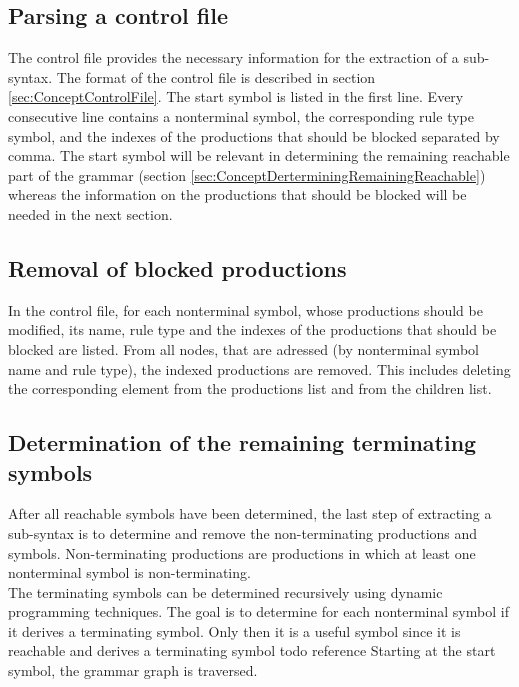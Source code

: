 \subsection{Parsing a control file}\label{sec:ConceptParsingControlFile}
The control file provides the necessary information for the extraction of a sub-syntax.
The format of the control file is described in section \ref{sec:ConceptControlFile}. 
The start symbol is listed in the first line.
Every consecutive line contains a nonterminal symbol, the corresponding rule type symbol, and the indexes of the productions that should be blocked separated by comma.
The start symbol will be relevant in determining the remaining reachable part of the grammar (section \ref{sec:ConceptDerterminingRemainingReachable}) whereas the information on the productions that should be blocked will be needed in the next section.

\subsection{Removal of blocked productions}\label{sec:ConceptRemovingBlockedProductions}
In the control file, for each nonterminal symbol, whose productions should be modified, its name, rule type and the indexes of the productions that should be blocked are listed.
From all nodes, that are adressed (by nonterminal symbol name and rule type), the indexed productions are removed.
This includes deleting the corresponding element from the productions list and from the children list.

\subsection{Determination of the remaining terminating symbols}\label{sec:ConceptDerterminingRemainingTerminating}
After all reachable symbols have been determined, the last step of extracting a sub-syntax is to determine and remove the non-terminating productions and symbols.
Non-terminating productions are productions in which at least one nonterminal symbol is non-terminating.\\

The terminating symbols can be determined recursively using dynamic programming techniques.
The goal is to determine for each nonterminal symbol if it derives a terminating symbol. Only then it is a useful symbol since it is reachable and derives a terminating symbol todo reference
Starting at the start symbol, the grammar graph is traversed. 

